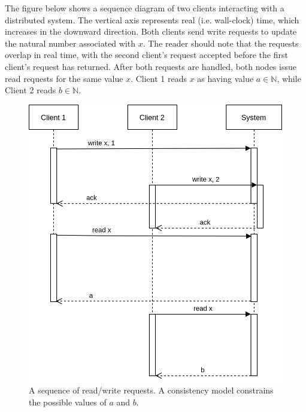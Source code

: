 The figure below shows a sequence diagram of two clients interacting
with a distributed system. The vertical axis represents real
(i.e. wall-clock) time, which increases in the downward
direction. Both clients send write requests to update the natural
number associated with $x$. The reader should note that the requests
overlap in real time, with the second client's request accepted before
the first client's request has returned. After both requests are
handled, both nodes issue read requests for the same value $x$. Client
1 reads $x$ as having value $a \in \mathbb{N}$, while Client 2 reads
$b \in \mathbb{N}$.

\begin{figure}
  \includegraphics[scale=0.6]{Sequence Diagram.png}
  \caption{A sequence of read/write requests. A consistency model constrains the possible values of $a$ and $b$.}
\end{figure}

